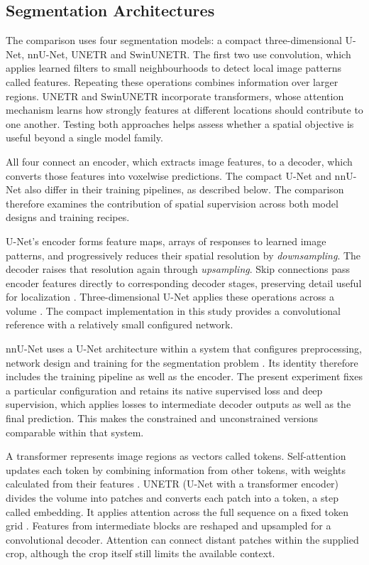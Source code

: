 \documentclass[12pt,a4paper]{article}
\begin{document}
\subsection{Segmentation Architectures}\label{sec:segmentation-architectures}

The comparison uses four segmentation models: a compact three-dimensional
U-Net, nnU-Net, UNETR and SwinUNETR. The first two use convolution, which
applies learned filters to small neighbourhoods to detect local image
patterns called features. Repeating these operations combines information
over larger regions. UNETR and SwinUNETR incorporate transformers, whose
attention mechanism learns how strongly features at different locations
should contribute to one another. Testing both approaches helps assess
whether a spatial objective is useful beyond a single model family.

All four connect an encoder, which extracts image features, to a decoder,
which converts those features into voxelwise predictions. The compact
U-Net and nnU-Net also differ in their training pipelines, as described
below. The comparison therefore examines the contribution of spatial
supervision across both model designs and training recipes.

U-Net's encoder forms feature maps, arrays of responses to learned image
patterns, and progressively reduces their spatial resolution by
\emph{downsampling}. The decoder raises that resolution again through
\emph{upsampling}. Skip connections pass encoder features directly to
corresponding decoder stages, preserving detail useful for localization
\cite{ronneberger2015unet}. Three-dimensional U-Net applies these operations
across a volume \cite{cicek2016unet}. The compact implementation in this
study provides a convolutional reference with a relatively small configured
network.

nnU-Net uses a U-Net architecture within a system that configures
preprocessing, network design and training for the segmentation problem
\cite{isensee2021nnunet}. Its identity therefore includes the training
pipeline as well as the encoder. The present experiment fixes a particular
configuration and retains its native supervised loss and deep supervision,
which applies losses to intermediate decoder outputs as well as the final
prediction. This makes the constrained and unconstrained versions comparable
within that system.

A transformer represents image regions as vectors called tokens.
Self-attention updates each token by combining information from other
tokens, with weights calculated from their features
\cite{vaswani2017attention}. UNETR (U-Net with a transformer encoder)
divides the volume into patches and converts each patch into a token, a step
called embedding. It applies attention across the full sequence on a fixed
token grid \cite{hatamizadeh2021unetr}. Features from intermediate blocks
are reshaped and upsampled for a convolutional decoder. Attention can
connect distant patches within the supplied crop, although the crop itself
still limits the available context.
\end{document}
